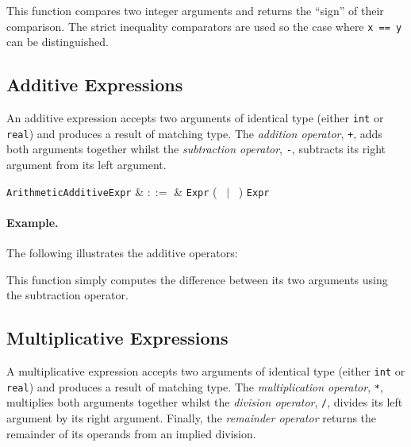 

This function compares two integer arguments and returns the ``sign'' of their comparison.  The strict inequality comparators are used so the case where \lstinline{x == y} can be distinguished.


\subsection{Additive Expressions}
\label{c_expr_additive}

An additive expression accepts two arguments of identical type (either \lstinline{int} or \lstinline{real}) and produces a result of matching type.  The {\em addition operator}, \lstinline{+}, adds both arguments together whilst the {\em subtraction operator}, \lstinline{-}, subtracts its right argument from its left argument.

\begin{syntax}
  \verb+ArithmeticAdditiveExpr+ & $::=$ & \verb+Expr+ \big(\ \token{+} $|$ \token{-}\ \big) \verb+Expr+\\
\end{syntax}

\paragraph{Example.}  The following illustrates the additive operators:



This function simply computes the difference between its two arguments using the subtraction operator.


\subsection{Multiplicative Expressions}
\label{c_expr_multiplicative}

A multiplicative expression accepts two arguments of identical type (either \lstinline{int} or \lstinline{real}) and produces a result of matching type.  The {\em multiplication operator}, \lstinline{*}, multiplies both arguments together whilst the {\em division operator}, \lstinline{/}, divides its left argument by its right argument.  Finally, the {\em remainder operator} returns the remainder of its operands from an implied division.  

